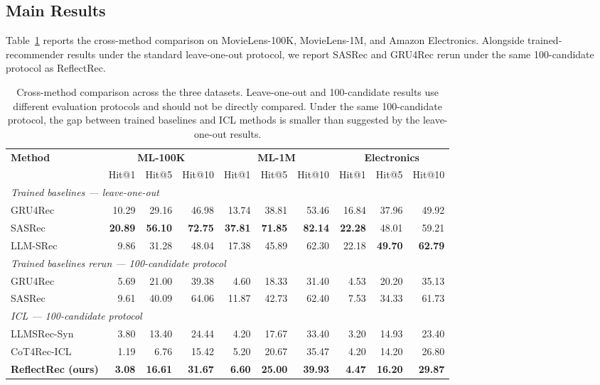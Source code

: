 \documentclass[11pt]{article}
\begin{document}
\subsection{Main Results}
\label{sec:main}
Table~\ref{tab:main_compare} reports the cross-method comparison on MovieLens-100K, MovieLens-1M, and Amazon Electronics. Alongside trained-recommender results under the standard leave-one-out protocol, we report SASRec and GRU4Rec rerun under the same 100-candidate protocol as ReflectRec.

\begin{table}[!t]
\centering
\small
\setlength{\tabcolsep}{6pt}
\begin{tabularx}{\linewidth}{X rrr rrr rrr}
\toprule
\multirow{2}{*}{\textbf{Method}}
  & \multicolumn{3}{c}{\textbf{ML-100K}}
  & \multicolumn{3}{c}{\textbf{ML-1M}}
  & \multicolumn{3}{c}{\textbf{Electronics}} \\
\cmidrule(lr){2-4} \cmidrule(lr){5-7} \cmidrule(lr){8-10}
& Hit@1 & Hit@5 & Hit@10
& Hit@1 & Hit@5 & Hit@10
& Hit@1 & Hit@5 & Hit@10 \\
\midrule
\multicolumn{10}{l}{\emph{Trained baselines --- leave-one-out}} \\
GRU4Rec
  & 10.29 & 29.16 & 46.98
  & 13.74 & 38.81 & 53.46
  & 16.84 & 37.96 & 49.92 \\
SASRec
  & \textbf{20.89} & \textbf{56.10} & \textbf{72.75}
  & \textbf{37.81} & \textbf{71.85} & \textbf{82.14}
  & \textbf{22.28} & 48.01 & 59.21 \\
LLM-SRec
  & 9.86  & 31.28 & 48.04
  & 17.38 & 45.89 & 62.30
  & 22.18 & \textbf{49.70} & \textbf{62.79} \\
\midrule
\multicolumn{10}{l}{\emph{Trained baselines rerun --- 100-candidate protocol}} \\
GRU4Rec
  & 5.69 & 21.00 & 39.38
  & 4.60 & 18.33 & 31.40
  & 4.53 & 20.20 & 35.13 \\
SASRec
  & 9.61 & 40.09 & 64.06
  & 11.87 & 42.73 & 62.40
  & 7.53 & 34.33 & 61.73 \\
\midrule
\multicolumn{10}{l}{\emph{ICL --- 100-candidate protocol}} \\
LLMSRec-Syn
  & 3.80  & 13.40 & 24.44
  & 4.20 & 17.67 & 33.40
  & 3.20 & 14.93 & 23.40 \\
CoT4Rec-ICL
  & 1.19 & 6.76 & 15.42
  & 5.20 & 20.67 & 35.47
  & 4.20 & 14.20 & 26.80 \\
\rowcolor{yellow!30}
\textbf{ReflectRec (ours)}
  & \textbf{3.08} & \textbf{16.61} & \textbf{31.67}
  & \textbf{6.60} & \textbf{25.00} & \textbf{39.93}
  & \textbf{4.47} & \textbf{16.20} & \textbf{29.87} \\
\bottomrule
\end{tabularx}
\caption{Cross-method comparison across the three datasets. Leave-one-out and 100-candidate results use different evaluation protocols and should not be directly compared. Under the same 100-candidate protocol, the gap between trained baselines and ICL methods is smaller than suggested by the leave-one-out results.\label{tab:main_compare}}
\end{table}
\end{document}
